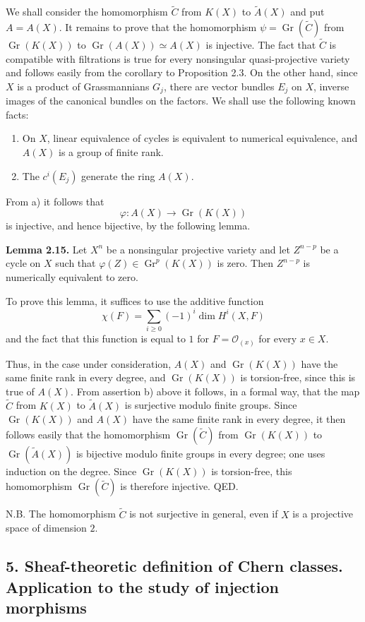 \documentclass[11pt]{article}
\newcommand{\Gr}{\operatorname{Gr}}
\providecommand{\Gr}{\operatorname{Gr}}
\providecommand{\Atil}{\widetilde A}
\providecommand{\Ctil}{\widetilde C}
\providecommand{\Gr}{\operatorname{G}}
\providecommand{\cO}{\mathcal O}
\begin{document}
We shall consider the homomorphism $\Ctil$ from $K(X)$ to $\Atil(X)$ and put $A=A(X)$. It remains to prove that the homomorphism $\psi=\Gr(\Ctil)$ from $\Gr(K(X))$ to $\Gr(A(X))\simeq A(X)$ is injective. The fact that $\Ctil$ is compatible with filtrations is true for every nonsingular quasi-projective variety and follows easily from the corollary to Proposition 2.3. On the other hand, since $X$ is a product of Grassmannians $G_j$, there are vector bundles $E_j$ on $X$, inverse images of the canonical bundles on the factors. We shall use the following known facts:
\begin{enumerate}[label=\alph*)]
\item On $X$, linear equivalence of cycles is equivalent to numerical equivalence, and $A(X)$ is a group of finite rank.
\item The $c^i(E_j)$ generate the ring $A(X)$.
\end{enumerate}
From a) it follows that
\[
 \varphi:A(X)\longrightarrow \Gr(K(X))
\]
is injective, and hence bijective, by the following lemma.

\textbf{Lemma 2.15.} Let $X^n$ be a nonsingular projective variety and let $Z^{n-p}$ be a cycle on $X$ such that $\varphi(Z)\in\Gr^p(K(X))$ is zero. Then $Z^{n-p}$ is numerically equivalent to zero.

To prove this lemma, it suffices to use the additive function
\[
 \chi(F)=\sum_{i\geq 0}(-1)^i\dim H^i(X,F)
\]
and the fact that this function is equal to $1$ for $F=\cO_{(x)}$ for every $x\in X$.

Thus, in the case under consideration, $A(X)$ and $\Gr(K(X))$ have the same finite rank in every degree, and $\Gr(K(X))$ is torsion-free, since this is true of $A(X)$. From assertion b) above it follows, in a formal way, that the map $\Ctil$ from $K(X)$ to $\Atil(X)$ is surjective modulo finite groups. Since $\Gr(K(X))$ and $A(X)$ have the same finite rank in every degree, it then follows easily that the homomorphism $\Gr(\Ctil)$ from $\Gr(K(X))$ to $\Gr(\Atil(X))$ is bijective modulo finite groups in every degree; one uses induction on the degree. Since $\Gr(K(X))$ is torsion-free, this homomorphism $\Gr(\Ctil)$ is therefore injective. QED.

N.B. The homomorphism $\Ctil$ is not surjective in general, even if $X$ is a projective space of dimension $2$.

\subsection*{5. Sheaf-theoretic definition of Chern classes. Application to the study of injection morphisms}
\end{document}
